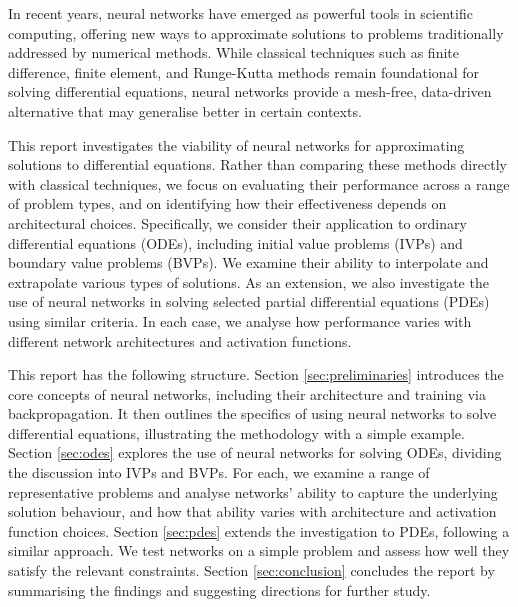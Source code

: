 In recent years, neural networks have emerged as powerful tools in scientific computing, 
offering new ways to approximate solutions to problems traditionally addressed by numerical methods. 
While classical techniques such as finite difference, finite element, and Runge-Kutta methods remain 
foundational for solving differential equations, neural networks provide a mesh-free, 
data-driven alternative that may generalise better in certain contexts.

This report investigates the viability of neural networks for approximating solutions to 
differential equations. Rather than comparing these methods directly with classical techniques, 
we focus on evaluating their performance across a range of problem types, and on identifying 
how their effectiveness depends on architectural choices. Specifically, we consider 
their application to ordinary differential equations (ODEs), 
including initial value problems (IVPs) and boundary value problems (BVPs). We 
examine their ability to interpolate and extrapolate various types of solutions. 
As an extension, we also investigate the use of neural networks in solving selected partial 
differential equations (PDEs) using similar criteria. In each case, we analyse how performance varies 
with different network architectures and activation functions.

This report has the following structure. Section \ref{sec:preliminaries} introduces the core concepts
 of neural networks, including their architecture and training via backpropagation. It then outlines 
the specifics of using neural networks to solve differential equations, illustrating the 
methodology with a simple example. Section \ref{sec:odes} explores the use of neural networks for 
solving ODEs, dividing the discussion into IVPs and BVPs. For each, we examine a range of 
representative problems and analyse networks' ability to capture the underlying solution behaviour, and how that 
ability varies with architecture and activation function choices. Section \ref{sec:pdes}
extends the investigation to PDEs, following a similar approach. 
We test networks on a simple problem and assess how well they satisfy the relevant constraints.
Section \ref{sec:conclusion} concludes the report by summarising the findings and 
suggesting directions for further study.
